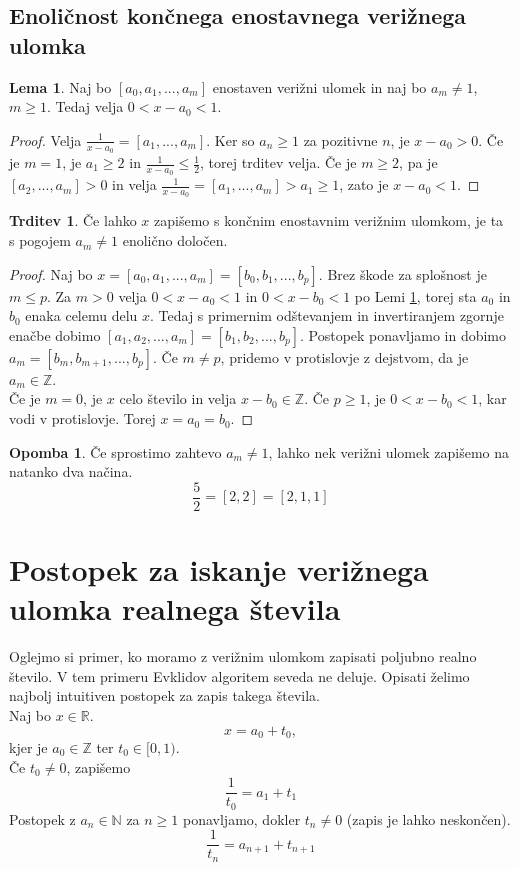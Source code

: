 \documentclass[a4paper,12pt]{article}
\newcommand{\N}{\mathbb{N}}
\newcommand{\R}{\mathbb{R}}
\newcommand{\Z}{\mathbb{Z}}
\theoremstyle{definition}
\theoremstyle{proposition}
\newtheorem{trd}{Trditev}[section]
\theoremstyle{theorem}
\theoremstyle{lemma}
\newtheorem{lem}{Lema}[section]
\newtheorem*{op}{Opomba}
\begin{document}
\subsection{Enoličnost končnega enostavnega verižnega ulomka} \label{enolicnost}

\begin{lem}
\label{celidel}
Naj bo $[a_0, a_1, ..., a_m]$ enostaven verižni ulomek in naj bo $a_m \neq 1$, $m \geq 1$. Tedaj velja $0<x-a_0<1$.
\end{lem}
\begin{proof}
Velja $\frac{1}{x-a_0} = [a_1, ..., a_m]$. Ker so $a_n \geq 1$ za pozitivne $n$, je $x-a_0 > 0$. Če je $m=1$, je $a_1 \geq 2$ in $\frac{1}{x-a_0} \leq \frac{1}{2}$, torej trditev velja. Če je $m\geq2$, pa je $ [a_2, ..., a_m] > 0$ in velja $\frac{1}{x-a_0} = [a_1, ..., a_m] > a_1 \geq1$, zato je $x-a_0<1$.
\end{proof}

\begin{trd}
\label{enolicnost}
Če lahko $x$ zapišemo s končnim enostavnim verižnim ulomkom, je ta s pogojem $a_m \neq 1$ enolično določen.
\end{trd}
\begin{proof}
Naj bo $x=[a_0, a_1, ..., a_m]=[b_0, b_1, ..., b_p]$. Brez škode za splošnost je $m\leq p$. Za $m>0$ velja $0<x-a_0<1$ in $0<x-b_0<1$ po Lemi \ref{celidel}, torej sta $a_0$ in $b_0$ enaka celemu delu $x$. Tedaj s primernim odštevanjem in invertiranjem zgornje enačbe dobimo $[a_1, a_2, ..., a_m]=[b_1, b_2, ..., b_p]$. Postopek ponavljamo in dobimo $a_m =[b_m, b_{m+1}, ..., b_p]$. Če $m \neq p$, pridemo v protislovje z dejstvom, da je $a_m \in \Z$. \\
Če je $m=0$, je $x$ celo število in velja $x-b_0 \in \Z$. Če $p\geq1$, je $0<x-b_0<1$, kar vodi v protislovje. Torej $x=a_0=b_0$. 
\end{proof}

\begin{op}
Če sprostimo zahtevo  $a_m \neq 1$, lahko nek verižni ulomek zapišemo na natanko dva načina. $$\frac{5}{2}=[2,2]=[2,1,1]$$
\end{op}

\section{Postopek za iskanje verižnega ulomka realnega števila} \label{realna}

Oglejmo si primer, ko moramo z verižnim ulomkom zapisati poljubno realno število. V tem primeru Evklidov algoritem seveda ne deluje. Opisati želimo najbolj intuitiven postopek za zapis takega števila.\\
\vspace{5mm}
Naj bo $x \in \R$.
\[ x = a_0+t_0, \]
kjer je $a_0 \in \Z$ ter $t_0 \in [0,1)$.\\
Če $t_0 \neq 0$, zapišemo \[ \frac{1}{t_0} = a_1 + t_1 \]
Postopek z $a_n \in \N$ za $n \geq 1$ ponavljamo, dokler $t_n \neq 0$ (zapis je lahko neskončen).
\[ \frac{1}{t_n} = a_{n+1}+t_{n+1} \] \vspace{5mm}
\end{document}
